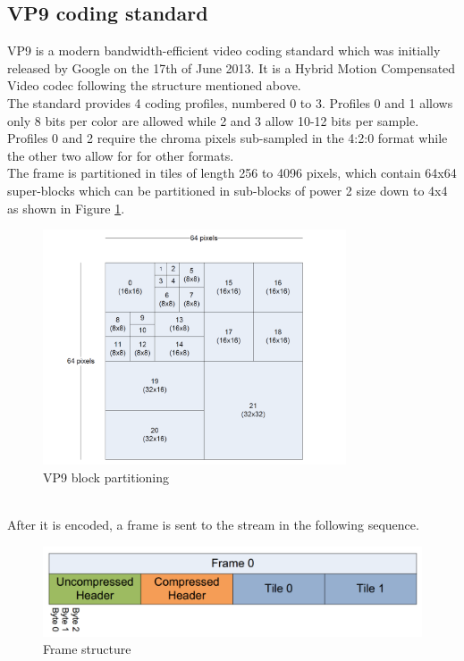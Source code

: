 \documentclass[a4paper,11pt,oneside]{article}
\begin{document}
\subsection{VP9 coding standard}
VP9 is a modern bandwidth-efficient video coding standard which was initially released by Google on the 17th of June 2013. It is a Hybrid Motion Compensated Video codec following the structure mentioned above. \\
\indent The standard provides 4 coding profiles, numbered 0 to 3. Profiles 0 and 1 allows only 8 bits per color are allowed while 2 and 3 allow 10-12 bits per sample. Profiles 0 and 2 require the chroma pixels sub-sampled in the 4:2:0 format while the other two allow for for other formats\cite[pp.~23]{vp9_bitstream}.\\
\indent The frame is partitioned in tiles of length 256 to 4096 pixels, which contain 64x64 super-blocks which can be partitioned in sub-blocks of power 2 size down to 4x4 as shown in Figure \ref{figure:vp9_block_partitioning}.
\begin{figure}[h]
  \centering
  \includegraphics[width=0.8\textwidth]{../figures/frame_partitioning.pdf}
  \caption{VP9 block partitioning \cite[pp.~15]{vp9_bitstream}}
  \label{figure:vp9_block_partitioning}
\end{figure} \\
\indent After it is encoded, a frame is sent to the stream in the following sequence. \\
\begin{figure}[h]
  \centering
  \includegraphics[width=\textwidth]{../figures/vp9_bitstream.pdf}
  \caption{Frame structure \cite[pp.~25]{vp9_bitstream}}
  \label{figure:vp9_frame}
\end{figure} \\
\end{document}
